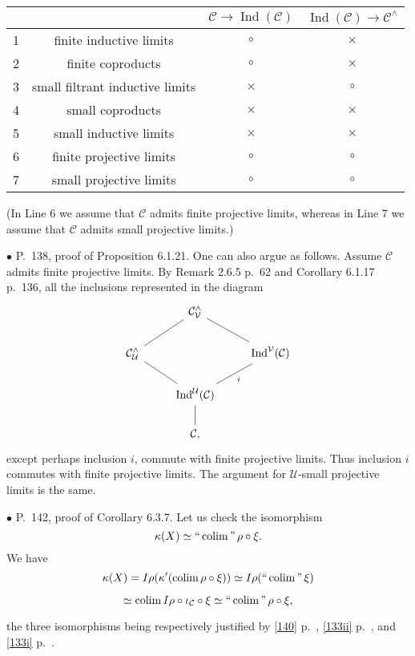 \documentclass[12pt]{article}
\theoremstyle{remark}%
\newcommand{\bu}{\bullet}
\newcommand{\n}{\noindent}
\newcommand{\C}{\mathcal C}
\newcommand{\U}{\mathcal U}
\newcommand{\V}{\mathcal V}
\DeclareMathOperator*{\coli}{colim}
\DeclareMathOperator*{\co}{colim}
\DeclareMathOperator*{\ic}{``\coli"}
\DeclareMathOperator{\Ind}{Ind}
\begin{document}
\begin{center}
\begin{tabular}{|c|c|c|c|}\hline
&&$\C\to\Ind(\C)$&$\Ind(\C)\to\C^\wedge$\\ \hline
1&finite inductive limits&$\circ$&$\times$\\ \hline
2&finite coproducts&$\circ$&$\times$\\ \hline
3&small filtrant inductive limits&$\times$&$\circ$\\ \hline
4&small coproducts&$\times$&$\times$\\ \hline
5&small inductive limits&$\times$&$\times$\\ \hline
6&finite projective limits&$\circ$&$\circ$\\ \hline
7&small projective limits&$\circ$&$\circ$\\ \hline
\end{tabular}
\end{center}%
\n (In Line 6 we assume that $\C$ admits finite projective limits, whereas in Line 7 we assume that $\C$ admits small projective limits.)%


\n$\bu$ P.~138, proof of Proposition 6.1.21. One can also argue as follows. Assume $\C$ admits finite projective limits. By Remark 2.6.5 p.~62 and Corollary 6.1.17 p.~136, all the inclusions represented in the diagram 
\[
\begin{tikzcd}
{}&\C^\wedge_\V\ar[-]{ld}\ar[-]{rd}\\
\C^\wedge_\U\ar[-]{rd}&&\Ind^\V(\C)\ar[-]{ld}{i}\\
&\Ind^\U(\C)\ar[-]{d}\\
&\C,
\end{tikzcd}
\]
except perhaps inclusion $i$, commute with finite projective limits. Thus inclusion $i$ commutes with finite projective limits. The argument for $\U$-small projective limits is the same. 


\n$\bu$ P.~142, proof of Corollary 6.3.7. Let us check the isomorphism 
$$
\kappa(X)\simeq\ic\rho\circ\xi. 
$$ 
We have 
$$
\kappa(X)=I\rho(\kappa'(\co\rho\circ\xi))\simeq I\rho(\ic\xi)
$$

$$
\simeq\co I\rho\circ\iota_\C\circ\xi\simeq\ic\rho\circ\xi, 
$$ 

\n the three isomorphisms being respectively justified by \eqref{140} p.~\pageref{140}, \eqref{133ii} p.~\pageref{133ii}, and \eqref{133i} p.~\pageref{133i}. 

\end{document}
